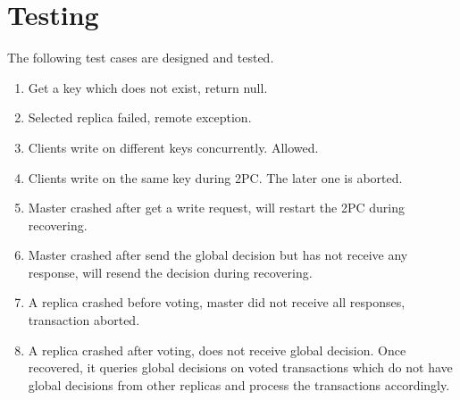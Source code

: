 \documentclass[11pt, oneside]{article}   	%
\begin{document}
\section{Testing}
The following test cases are designed and tested.
\begin{enumerate}
\item Get a key which does not exist, return null.
\item Selected replica failed, remote exception.
\item Clients write on different keys concurrently. Allowed.
\item Clients write on the same key during 2PC. The later one is aborted.
\item Master crashed after get a write request, will restart the 2PC during recovering.
\item Master crashed after send the global decision but has not receive any response, will resend the decision during recovering.
\item A replica crashed before voting, master did not receive all responses, transaction aborted.
\item A replica crashed after voting, does not receive global decision. Once recovered, it queries global decisions on voted transactions which do not have global decisions from other replicas and process the transactions accordingly.
\end{enumerate}
\end{document}
